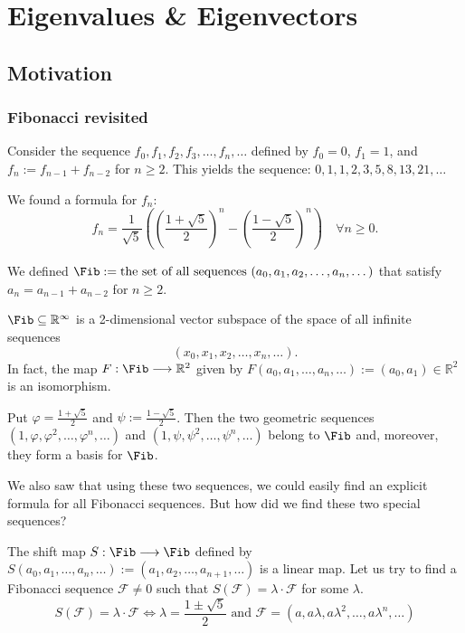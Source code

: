 \setcounter{chapter}{20} %
\chapter{Eigenvalues \& Eigenvectors}

\section{Motivation}

\subsection{Fibonacci revisited}
Consider the sequence $f_0, f_1, f_2, f_3, \dots, f_n, \dots$ defined by $f_0 = 0$, $f_1 = 1$, and $f_n := f_{n-1} + f_{n-2}$ for $n \ge 2$.
This yields the sequence: $0, 1, 1, 2, 3, 5, 8, 13, 21, \dots$

We found a formula for $f_n$:
\[ f_n = \frac{1}{\sqrt{5}} \left( \left(\frac{1+\sqrt{5}}{2}\right)^n - \left(\frac{1-\sqrt{5}}{2}\right)^n \right) \quad \forall n \ge 0. \]

We defined $\Fib := \text{the set of all sequences } (a_0, a_1, a_2, \dots, a_n, \dots)$ that satisfy $a_n = a_{n-1} + a_{n-2}$ for $n \ge 2$.

\begin{claim*}\label{claim:fib_subspace}
  $\Fib \subseteq \mathbb{R}^{\infty}$ is a 2-dimensional vector subspace of the space of all infinite sequences \[(x_0, x_1, x_2, \dots, x_n, \dots).\]
  In fact, the map $F : \Fib \longrightarrow \mathbb{R}^2$ given by $F(a_0, a_1, \dots, a_n, \dots) := (a_0, a_1) \in \mathbb{R}^2$ is an isomorphism.
\end{claim*}

\begin{claim*}\label{claim:fib_basis}
  Put $\varphi = \frac{1+\sqrt{5}}{2}$ and $\psi := \frac{1-\sqrt{5}}{2}$. Then the two geometric sequences $(1, \varphi, \varphi^2, \dots, \varphi^n, \dots)$ and $(1, \psi, \psi^2, \dots, \psi^n, \dots)$ belong to $\Fib$ and, moreover, they form a basis for $\Fib$.
\end{claim*}

We also saw that using these two sequences, we could easily find an explicit formula for all Fibonacci sequences. But how did we find these two special sequences?

The shift map $S : \Fib \longrightarrow \Fib$ defined by $S(a_0, a_1, \dots, a_n, \dots) := (a_1, a_2, \dots, a_{n+1}, \dots)$ is a linear map.
Let us try to find a Fibonacci sequence $\mathcal{F} \ne 0$ such that $S(\mathcal{F}) = \lambda \cdot \mathcal{F}$ for some $\lambda$.
\[ S(\mathcal{F}) = \lambda \cdot \mathcal{F} \iff \lambda = \frac{1\pm\sqrt{5}}{2} \text{ and } \mathcal{F} = (a, a\lambda, a\lambda^2, \dots, a\lambda^n, \dots) \]

